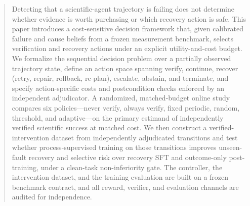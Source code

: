 \begin{abstract}
\label{sec:abstract}

Detecting that a scientific-agent trajectory is failing does not determine
whether evidence is worth purchasing or which recovery action is safe. This
paper introduces a cost-sensitive decision framework that, given calibrated
failure and cause beliefs from a frozen measurement benchmark, selects
verification and recovery actions under an explicit utility-and-cost budget.
We formalize the sequential decision problem over a partially observed
trajectory state, define an action space spanning verify, continue, recover
(retry, repair, rollback, re-plan), escalate, abstain, and terminate, and
specify action-specific costs and postcondition checks enforced by an
independent adjudicator. A randomized, matched-budget online study compares
six policies—never verify, always verify, fixed periodic, random, threshold,
and adaptive—on the primary estimand of independently verified scientific
success at matched cost. We then construct a verified-intervention dataset
from independently adjudicated transitions and test whether
process-supervised training on those transitions improves unseen-fault
recovery and selective risk over recovery SFT and outcome-only
post-training, under a clean-task non-inferiority gate. The controller, the
intervention dataset, and the training evaluation are built on a frozen
benchmark contract, and all reward, verifier, and evaluation channels are
audited for independence.
\end{abstract}
